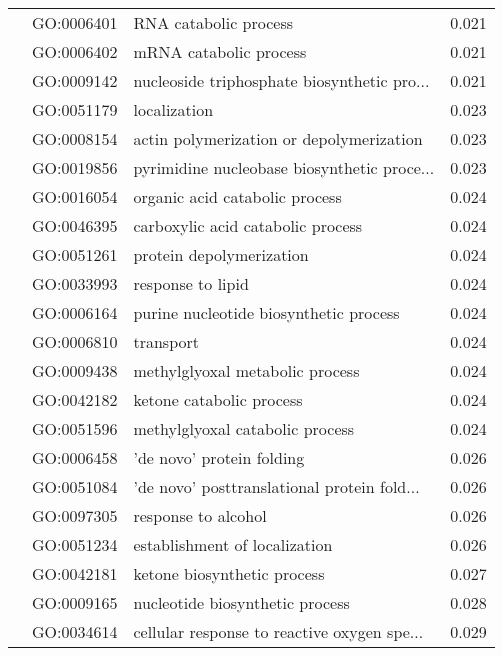 \begin{longtable}{lllr}
   & GO:0006401 &                        RNA catabolic process &         0.021 \\
   & GO:0006402 &                       mRNA catabolic process &         0.021 \\
   & GO:0009142 &  nucleoside triphosphate biosynthetic pro... &         0.021 \\
   & GO:0051179 &                                 localization &         0.023 \\
   & GO:0008154 &     actin polymerization or depolymerization &         0.023 \\
   & GO:0019856 &  pyrimidine nucleobase biosynthetic proce... &         0.023 \\
   & GO:0016054 &               organic acid catabolic process &         0.024 \\
   & GO:0046395 &            carboxylic acid catabolic process &         0.024 \\
   & GO:0051261 &                     protein depolymerization &         0.024 \\
   & GO:0033993 &                            response to lipid &         0.024 \\
   & GO:0006164 &       purine nucleotide biosynthetic process &         0.024 \\
   & GO:0006810 &                                    transport &         0.024 \\
   & GO:0009438 &              methylglyoxal metabolic process &         0.024 \\
   & GO:0042182 &                     ketone catabolic process &         0.024 \\
   & GO:0051596 &              methylglyoxal catabolic process &         0.024 \\
   & GO:0006458 &                    'de novo' protein folding &         0.026 \\
   & GO:0051084 &  'de novo' posttranslational protein fold... &         0.026 \\
   & GO:0097305 &                          response to alcohol &         0.026 \\
   & GO:0051234 &                establishment of localization &         0.026 \\
   & GO:0042181 &                  ketone biosynthetic process &         0.027 \\
   & GO:0009165 &              nucleotide biosynthetic process &         0.028 \\
   & GO:0034614 &  cellular response to reactive oxygen spe... &         0.029 \\

\end{longtable}
